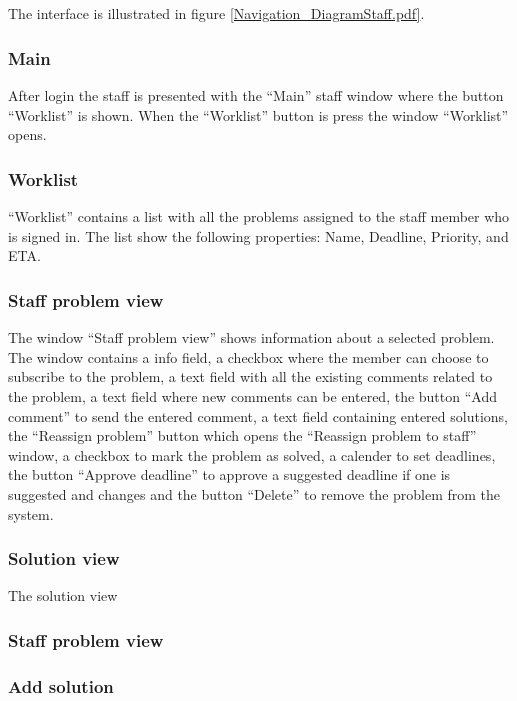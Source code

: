 
\subsection{\sinterface}
The \astaff interface is illustrated in figure \ref{Navigation_DiagramStaff.pdf}.

\subsubsection{Main}
 After login the staff is presented with the ``Main'' staff window where the button ``Worklist'' is shown. When the ``Worklist'' button is press the window ``Worklist'' opens. 


\subsubsection{Worklist}
``Worklist'' contains a list with all the problems assigned to the staff member who is signed in. The list show the following properties: Name, Deadline, Priority, and ETA.


\subsubsection{Staff problem view}
The window ``Staff problem view'' shows information about a selected problem. The window contains a info field, a checkbox where the \astaff member can choose to subscribe to the problem, a text field with all the existing comments related to the problem, a text field where new comments can be entered, the button ``Add comment'' to send the entered comment, a text field containing entered solutions, the ``Reassign problem'' button which opens the ``Reassign problem to staff'' window, a checkbox to mark the problem as solved, a calender to set deadlines, the button ``Approve deadline'' to approve a suggested deadline if one is suggested and changes and the button ``Delete'' to remove the problem from the system.   

\subsubsection{Solution view}
The solution view 

\subsubsection{Staff problem view}




\subsubsection{Add solution}

